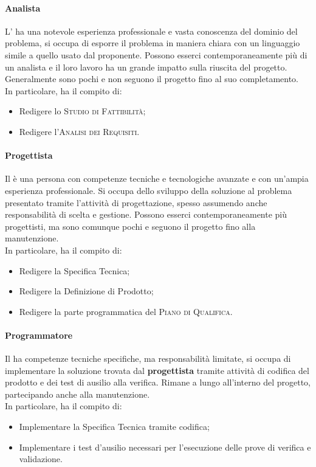 \paragraph{Analista}

L'\textbf{} ha una notevole esperienza professionale e vasta conoscenza del dominio del problema, 
si occupa di esporre il problema in maniera chiara con un linguaggio simile a quello usato dal proponente. Possono 
esserci contemporaneamente più di un analista e il loro lavoro ha un grande impatto sulla riuscita del progetto. 
Generalmente sono pochi e non seguono il progetto fino al suo completamento.\\
In particolare, ha il compito di:
\begin{itemize} 
    \item Redigere lo \textsc{Studio di Fattibilità};
    \item Redigere l'\textsc{Analisi dei Requisiti}.
\end{itemize}

\paragraph{Progettista}

Il \textbf{} è una persona con competenze tecniche e tecnologiche avanzate e con un'ampia 
esperienza professionale. Si occupa dello sviluppo della soluzione al problema presentato tramite l'attività di 
progettazione, spesso assumendo anche responsabilità di scelta e gestione. Possono esserci contemporaneamente più 
progettisti, ma sono comunque pochi e seguono il progetto fino alla manutenzione.\\
In particolare, ha il compito di:
\begin{itemize}
    \item Redigere la Specifica Tecnica;
    \item Redigere la Definizione di Prodotto;
    \item Redigere la parte programmatica del \textsc{Piano di Qualifica}.
\end{itemize}

\paragraph{Programmatore}

Il \textbf{} ha competenze tecniche specifiche, ma responsabilità limitate, si occupa di 
implementare la soluzione trovata dal \textbf{progettista} tramite attività di codifica del prodotto e dei test di 
ausilio alla verifica. Rimane a lungo all'interno del progetto, partecipando anche alla manutenzione.\\
In particolare, ha il compito di:
\begin{itemize}
    \item Implementare la Specifica Tecnica tramite codifica;
    \item Implementare i test d'ausilio necessari per l'esecuzione delle prove di verifica e validazione.
\end{itemize}

